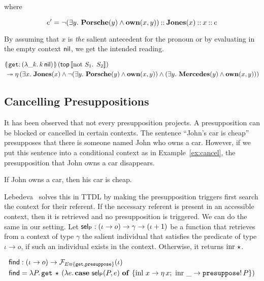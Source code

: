 where

$$
e' = \lnot (\exists y.\ \textbf{Porsche}(y) \land \textbf{own}(x, y)) \mathbin{::}
     \textbf{Jones}(x) \mathbin{::} x \mathbin{::} e
$$

By assuming that $x$ is \emph{the} salient antecedent for the pronoun or by
evaluating in the empty context $\textsf{nil}$, we get the intended reading.

\begin{align*}
  &\ap{\banana{\onto{\op{get}}{(\lam{\_ k}{\ap{k}{\nil}})}}}{(\ap{\TOP}{\sem{\text{not $S_1$. $S_2$}}})} \\
  &\tto \etaE{(\exists x.\
          \obj{Jones}(x) \land
          \lnot (\exists y.\ \obj{Porsche}(y) \land \obj{own}(x, y)) \land
          (\exists y.\ \obj{Mercedes}(y) \land \obj{own}(x, y)))}
\end{align*}


\subsection{Cancelling Presuppositions}
\label{ssec:cancelling-presuppositions}

It has been observed that not every presupposition projects. A
presupposition can be blocked or cancelled in certain contexts. The
sentence ``John's car is cheap'' presupposes that there is someone named
John who owns a car. However, if we put this sentence into a conditional
context as in Example~\ref{ex:cancel}, the presupposition that John owns a
car disappears.

\begin{exe}
  \ex \label{ex:cancel} If John owns a car, then his car is cheap.
\end{exe}

Lebedeva~\cite{lebedeva2012expression} solves this in TTDL by making the
presupposition triggers first search the context for their referent. If the
necessary referent is present in an accessible context, then it is
retrieved and no presupposition is triggered. We can do the same in our
setting. Let $\textsf{sel}_{\textsf{P}} : (\iota \to o) \to \gamma \to (\iota + 1)$ be a
function that retrieves from a context of type $\gamma$ the salient
individual that satisfies the predicate of type $\iota \to o$, if such an
individual exists in the context. Otherwise, it returns $\operatorname{inr}\,\star$.

\begin{align*}
  \textsf{find} &: (\iota \to o) \to \mathcal{F}_{E \uplus \{\mathtt{get}, \mathtt{presuppose}\}}(\iota) \\
  \textsf{find} &= \lambda P.\, \mathtt{get}\,\star\,(\lambda e.\, \text{\textbf{case} $\textsf{sel}_{\textsf{P}}(P, e)$ \textbf{of} $\{ \operatorname{inl}\,x \to \eta\,x;\ \operatorname{inr}\,\_ \to \mathtt{presuppose}!\,P \}$})
\end{align*}

